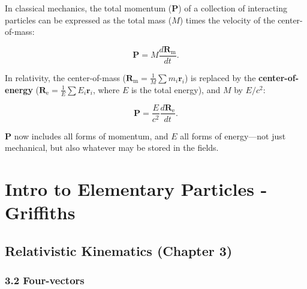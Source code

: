 \documentclass[12pt]{book}
\begin{document}
        In classical mechanics, the total momentum (\(\bm{P}\)) of a collection of interacting particles can be expressed as the total mass (\(M\)) times the velocity of the center-of-mass:
        
        \[
        \bm{P} = M \frac{d\bm{R}_\text{m}}{dt}.
        \]
        
        In relativity, the center-of-mass (\(\bm{R}_\text{m} = \frac{1}{M} \sum m_i \bm{r}_i\)) is replaced by the \textbf{center-of-energy} (\(\bm{R}_\text{e} = \frac{1}{E} \sum E_i \bm{r}_i\), where \(E\) is the total energy), and \(M\) by \(E/c^2\):
        
        \[
        \bm{P} = \frac{E}{c^2} \frac{d\bm{R}_\text{e}}{dt}.
        \]
        
        \(\bm{P}\) now includes all forms of momentum, and \(E\) all forms of energy—not just mechanical, but also whatever may be stored in the fields.
        
\chapter{Intro to Elementary Particles - Griffiths}

    \section{Relativistic Kinematics (Chapter 3)}
        \subsection{3.2 Four-vectors}
\end{document}
